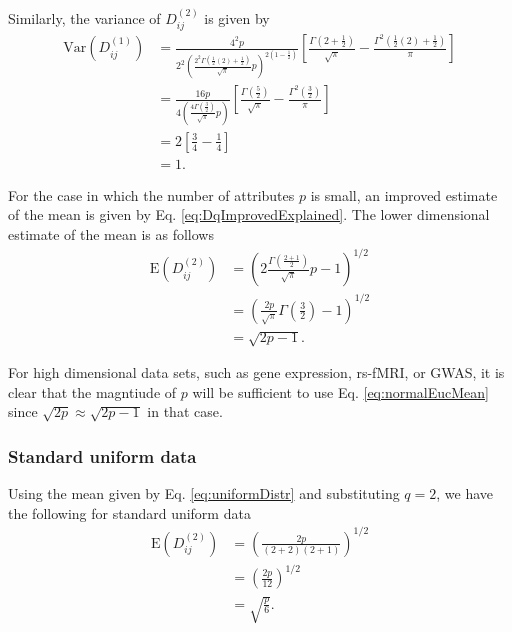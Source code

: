 \documentclass[10pt,letterpaper]{article}\usepackage[]{graphicx}\usepackage[]{color}
\begin{document}
Similarly, the variance of $D^{(2)}_{ij}$ is given by
%
\begin{equation}\label{eq:normalEucVar}
\begin{aligned}
\text{Var}\left(D^{(1)}_{ij}\right) &= \frac{4^2p}{2^2\left(\frac{2^2\Gamma\left(\frac{1}{2}(2) + \frac{1}{2}\right)}{\sqrt{\pi}}p\right)^{2\left(1 - \frac{1}{2}\right)}}\left[\frac{\Gamma\left(2 + \frac{1}{2}\right)}{\sqrt{\pi}} - \frac{\Gamma^2\left(\frac{1}{2}(2) + \frac{1}{2}\right)}{\pi}\right] \\
&= \frac{16p}{4\left(\frac{4\Gamma\left(\frac{3}{2}\right)}{\sqrt{\pi}}p\right)}\left[\frac{\Gamma\left(\frac{5}{2}\right)}{\sqrt{\pi}} - \frac{\Gamma^2\left(\frac{3}{2}\right)}{\pi}\right] \\
&= 2\left[\frac{3}{4} - \frac{1}{4}\right] \\
&= 1.
\end{aligned}
\end{equation}

For the case in which the number of attributes $p$ is small, an improved estimate of the mean is given by Eq. \ref{eq:DqImprovedExplained}. The lower dimensional estimate of the mean is as follows
%
\begin{equation}\label{eq:normalEucMeanImproved}
\begin{aligned}
\text{E}\left(D^{(2)}_{ij}\right) &= \left(2\frac{\Gamma\left(\frac{2 + 1}{2}\right)}{\sqrt{\pi}}p - 1\right)^{1/2} \\
&= \left(\frac{2p}{\sqrt{\pi}}\Gamma\left(\frac{3}{2}\right) - 1\right)^{1/2} \\
&= \sqrt{2p - 1}.
\end{aligned}
\end{equation}

For high dimensional data sets, such as gene expression, rs-fMRI, or GWAS, it is clear that the magntiude of $p$ will be sufficient to use Eq. \ref{eq:normalEucMean} since $\sqrt{2p} \approx \sqrt{2p - 1}$ in that case.

\subsubsection{Standard uniform data}

Using the mean given by Eq. \ref{eq:uniformDistr} and substituting $q=2$, we have the following for standard uniform data
%
\begin{equation}\label{eq:uniformEucMean}
\begin{aligned}
\text{E}\left(D^{(2)}_{ij}\right) &= \left(\frac{2p}{(2+2)(2+1)}\right)^{1/2} \\
&= \left(\frac{2p}{12}\right)^{1/2} \\
&= \sqrt{\frac{p}{6}}.
\end{aligned}
\end{equation}
\end{document}
